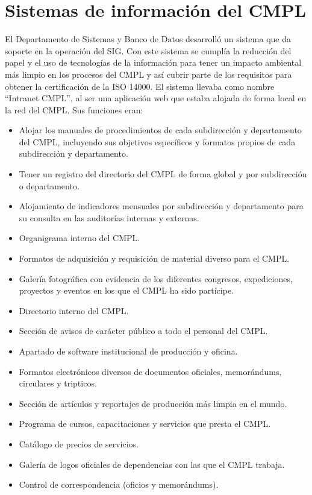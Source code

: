 	\section{Sistemas de información del CMPL}
	El Departamento de Sistemas y Banco de Datos desarrolló un sistema que da soporte en la operación del SIG. Con este sistema se cumplía la reducción del papel y el uso de tecnologías de la información para tener un impacto ambiental más limpio en los procesos del CMPL  y así cubrir parte de los requisitos para obtener la certificación de la ISO 14000. El sistema llevaba como nombre ``Intranet CMPL'', al ser una aplicación web que estaba alojada de forma local en la red del CMPL. Sus funciones eran:\\
	
	\begin{itemize}
		\item Alojar los manuales de procedimientos de cada subdirección y departamento del CMPL, incluyendo sus objetivos específicos y formatos propios de cada subdirección y departamento.
		\item Tener un registro del directorio del CMPL de forma global y por subdirección o departamento. 
		\item Alojamiento de indicadores mensuales por subdirección y departamento para su consulta en las auditorías internas y externas.
		\item Organigrama interno del CMPL.
		\item Formatos de adquisición y requisición de material diverso para el CMPL.
		\item Galería fotográfica con evidencia de los diferentes congresos, expediciones, proyectos y eventos en los que el CMPL ha sido partícipe.
		\item Directorio interno del CMPL.
		\item Sección de avisos de carácter público a todo el personal del CMPL. 
		\item Apartado de software institucional de producción y oficina.
		\item Formatos electrónicos diversos de documentos oficiales, memorándums, circulares y tripticos.
		\item Sección de artículos y reportajes de producción más limpia en el mundo.
		\item Programa de cursos, capacitaciones y servicios que presta el CMPL.
		\item Catálogo de precios de servicios.
		\item Galería de logos oficiales de dependencias con las que el CMPL trabaja.
		\item Control de correspondencia (oficios y memorándums).
	\end{itemize}
	
